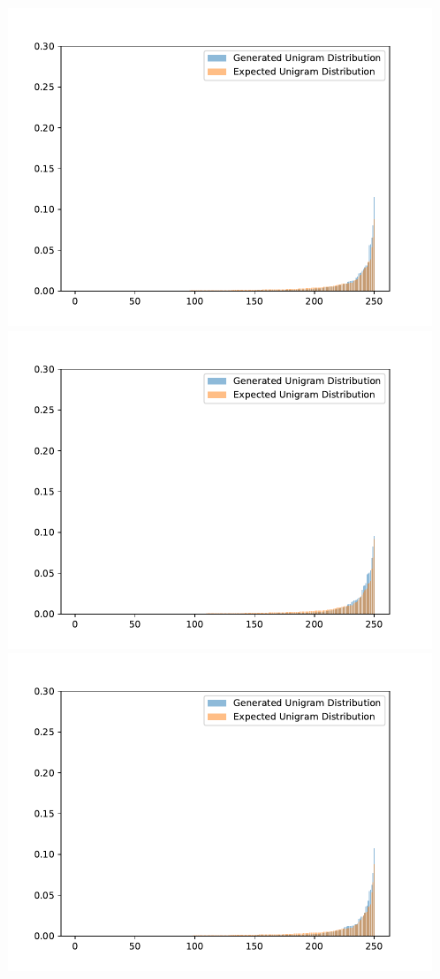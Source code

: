 \begin{figure}[H]
  \includegraphics[width=\linewidth]{img/plots/reddit/unigram_distribution_comparison_step_1500000.pdf}
  \centering
  \small
  \endminipage\hfill
  \includegraphics[width=\linewidth]{img/plots/reddit/unigram_distribution_comparison_step_2000000.pdf}
  \centering
  \small
  \endminipage\hfill
  \includegraphics[width=\linewidth]{img/plots/reddit/unigram_distribution_comparison_step_2500000.pdf}

\end{figure}
